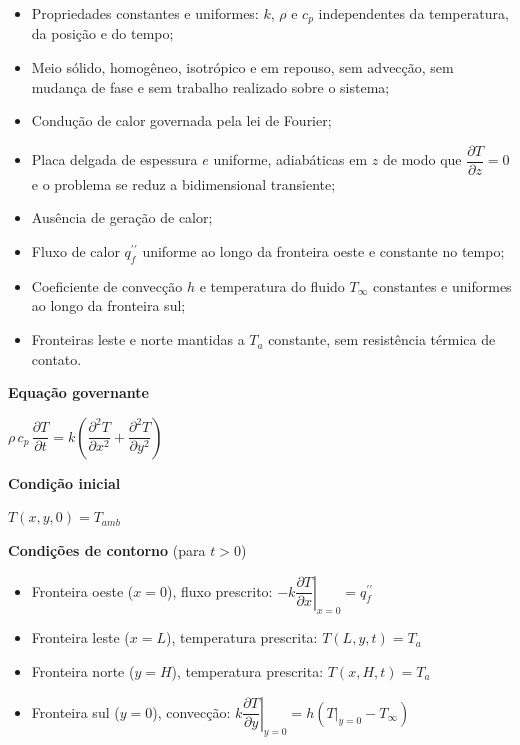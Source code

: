 \begin{itemize}
    \item [1 - ]Propriedades constantes e uniformes: $k$, $\rho$ e $c_{p}$ independentes da temperatura, da posição e do tempo;
    \item [2 - ]Meio sólido, homogêneo, isotrópico e em repouso, sem advecção, sem mudança de fase e sem trabalho realizado sobre o sistema;
    \item [3 - ]Condução de calor governada pela lei de Fourier;
    \item [4 - ]Placa delgada de espessura $e$ uniforme, adiabáticas em $z$ de modo que $\dfrac{\partial T}{\partial z} = 0$ e o problema se reduz a bidimensional transiente;
    \item [5 - ]Ausência de geração de calor;
    \item [6 - ]Fluxo de calor $q^{\prime\prime}_{f}$ uniforme ao longo da fronteira oeste e constante no tempo;
    \item [7 - ]Coeficiente de convecção $h$ e temperatura do fluido $T_{\infty}$ constantes e uniformes ao longo da fronteira sul;
    \item [8 - ]Fronteiras leste e norte mantidas a $T_{a}$ constante, sem resistência térmica de contato.
\end{itemize}

\vspace{0.5cm}
\noindent\textbf{Equação governante}

\begin{center}
    $\rho\,c_{p}\,\dfrac{\partial T}{\partial t} = k\left(\dfrac{\partial^{2} T}{\partial x^{2}} + \dfrac{\partial^{2} T}{\partial y^{2}}\right)$
\end{center}

\vspace{0.5cm}
\noindent\textbf{Condição inicial}

\begin{center}
    $T(x,y,0) = T_{amb}$
\end{center}

\vspace{0.5cm}
\noindent\textbf{Condições de contorno} (para $t>0$)

\begin{itemize}
    \item [-]Fronteira oeste ($x=0$), fluxo prescrito: $-k\left.\dfrac{\partial T}{\partial x}\right|_{x=0} = q^{\prime\prime}_{f}$
    \item [-]Fronteira leste ($x=L$), temperatura prescrita: $T(L,y,t) = T_{a}$
    \item [-]Fronteira norte ($y=H$), temperatura prescrita: $T(x,H,t) = T_{a}$
    \item [-]Fronteira sul ($y=0$), convecção: $k\left.\dfrac{\partial T}{\partial y}\right|_{y=0} = h\left(\left.T\right|_{y=0} - T_{\infty}\right)$
\end{itemize}

